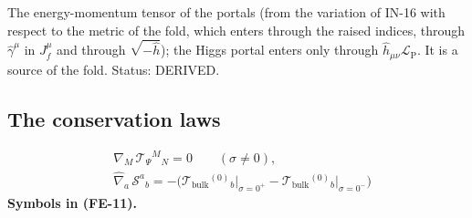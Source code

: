 \documentclass[
  10pt,
]{article}
\begin{document}
The energy-momentum tensor of the portals (from the variation of IN-16
with respect to the metric of the fold, which enters through the raised
indices, through \(\hat\gamma^\mu\) in \(J_f^\mu\) and through
\(\sqrt{-\hat h}\)); the Higgs portal enters only through
\(\hat h_{\mu\nu}\mathcal{L}_{\mathrm{P}}\). It is a source of the fold.
Status: DERIVED.

\hypertarget{the-conservation-laws}{%
\subsection{The conservation laws}\label{the-conservation-laws}}

\[
\begin{aligned}
&\nabla_M\,\mathcal{T}_\Psi{}^M{}_N = 0\qquad (\sigma \ne 0),\\
&\hat\nabla_a\,\mathcal{S}^a{}_b = -\Big(\mathcal{T}_{\mathrm{bulk}}{}^{(0)}{}_b\big\vert_{\sigma=0^+}
 - \mathcal{T}_{\mathrm{bulk}}{}^{(0)}{}_b\big\vert_{\sigma=0^-}\Big)
\end{aligned} \tag{FE-11}
\] \textbf{Symbols in (FE-11).}
\end{document}
